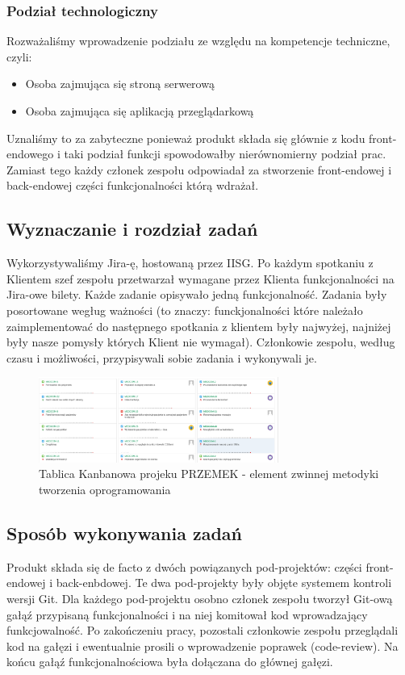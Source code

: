 \documentclass[polish,12pt]{aghthesis}
\begin{document}
\subsubsection{Podział technologiczny}
Rozważaliśmy wprowadzenie podziału ze względu na kompetencje techniczne, czyli:
\begin{itemize}
    \item Osoba zajmująca się stroną serwerową
    \item Osoba zajmująca się aplikacją przeglądarkową
\end{itemize}
Uznaliśmy to za zabyteczne ponieważ produkt składa się głównie z kodu front-endowego i taki podział funkcji spowodowałby nierównomierny podział prac. Zamiast tego każdy członek zespołu odpowiadał za stworzenie front-endowej i back-endowej części funkcjonalności którą wdrażał.

\subsection{Wyznaczanie i rozdział zadań}
Wykorzystywaliśmy Jira-ę, hostowaną przez IISG. Po każdym spotkaniu z Klientem szef zespołu przetwarzał wymagane przez Klienta funkcjonalności na Jira-owe bilety. Każde zadanie opisywało jedną funkcjonalność. Zadania były posortowane wegług ważności (to znaczy: funckjonalności które należało zaimplementować do następnego spotkania z klientem były najwyżej, najniżej były nasze pomysły których Klient nie wymagał). Członkowie zespołu, według czasu i możliwości, przypisywali sobie zadania i wykonywali je.
 \begin{figure}[H]
    \includegraphics[width=0.7\textwidth]{jira-kanban}
    \caption{Tablica Kanbanowa projeku PRZEMEK - element zwinnej metodyki tworzenia oprogramowania}
    \end{figure}

\subsection{Sposób wykonywania zadań}
Produkt składa się de facto z dwóch powiązanych pod-projektów: części front-endowej i back-enbdowej. Te dwa pod-projekty były objęte systemem kontroli wersji Git. Dla każdego pod-projektu osobno członek zespołu tworzył Git-ową gałąź przypisaną funkcjonalności i na niej komitował kod wprowadzający funkcjowalność. Po zakończeniu pracy, pozostali członkowie zespołu przeglądali kod na gałęzi i ewentualnie prosili o wprowadzenie poprawek (code-review). Na końcu gałąź funkcjonalnościowa była dołączana do głównej gałęzi.
\end{document}

